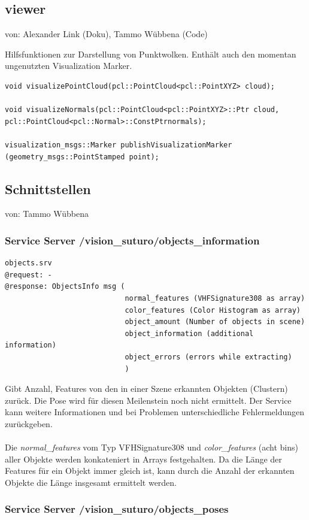 \documentclass{suturo}
\makeatletter
\newcommand{\chapterauthor}[1]{%
  {\parindent0pt\vspace*{-27pt}%
  \linespread{0}\small\begin{flushright}von: #1\end{flushright}%
  \par\nobreak\vspace*{0pt}}
  \@afterheading%
}
\makeatother
\begin{document}
\subsection*{viewer}
\chapterauthor{Alexander Link (Doku), Tammo Wübbena (Code)}
Hilfsfunktionen zur Darstellung von Punktwolken.
Enthält auch den momentan ungenutzten Visualization Marker.

\begin{verbatim}
void visualizePointCloud(pcl::PointCloud<pcl::PointXYZ> cloud);

void visualizeNormals(pcl::PointCloud<pcl::PointXYZ>::Ptr cloud,
pcl::PointCloud<pcl::Normal>::ConstPtrnormals);

visualization_msgs::Marker publishVisualizationMarker
(geometry_msgs::PointStamped point);
\end{verbatim}


\subsection{Schnittstellen}
\chapterauthor{Tammo Wübbena}

\subsubsection{Service Server /vision\_suturo/objects\_information}
\begin{verbatim}
objects.srv
@request: -
@response: ObjectsInfo msg (
							normal_features (VHFSignature308 as array)
							color_features (Color Histogram as array)
							object_amount (Number of objects in scene)
							object_information (additional information)
							object_errors (errors while extracting)
							)
\end{verbatim}
Gibt Anzahl, Features von den in einer Szene erkannten Objekten (Clustern) zurück. Die Pose wird für diesen Meilenstein noch nicht ermittelt. Der Service kann weitere Informationen und bei Problemen unterschiedliche Fehlermeldungen zurückgeben.
\\ \\
Die \textit{normal\_features} vom Typ VFHSignature308 und \textit{color\_features} (acht bins) aller Objekte werden konkateniert in Arrays festgehalten. 
Da die Länge der Features für ein Objekt immer gleich ist, kann durch die Anzahl der erkannten Objekte die Länge insgesamt ermittelt werden.

\subsubsection{Service Server /vision\_suturo/objects\_poses}
\end{document}
